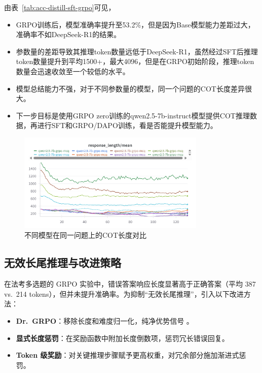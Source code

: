 \documentclass{pkuthesis}
\begin{document}
由表~\ref{tab:acc-distill-sft-grpo}可见，  
\begin{itemize}
  \item GRPO训练后，模型准确率提升至53.2\%，但是因为Base模型能力差距过大，准确率不如DeepSeek-R1的结果。
  \item 参数量的差距导致其推理token数量远低于DeepSeek-R1，虽然经过SFT后推理token数量提升到平均1500+，最大4096，但是在GRPO初始阶段，推理token数量会迅速收敛至一个较低的水平。
  \item 模型总结能力不强，对于不同参数量的模型，同一个问题的COT长度差异很大。
  \item 下一步目标是使用GRPO zero训练的qwen2.5-7b-instruct模型提供COT推理数据，再进行SFT和GRPO/DAPO训练，看是否能提升模型能力。
\end{itemize}
\begin{figure}[h]
  \centering
  \includegraphics[width=0.8\textwidth]{figures/COT_length_comparison.png}
  \caption{不同模型在同一问题上的COT长度对比}
  \label{fig:cot-length-comparison}
\end{figure}


\subsection{无效长尾推理与改进策略}

在法考多选题的 GRPO 实验中，错误答案响应长度显著高于正确答案（平均 387 vs.\ 214 tokens），但并未提升准确率。为抑制“无效长尾推理”，引入以下改进方法：

\begin{itemize}
  \item \textbf{Dr.\ GRPO}：移除长度和难度归一化，纯净优势信号 \cite{liu2025understanding}。
  \item \textbf{显式长度惩罚}：在奖励函数中附加长度倒数项，惩罚冗长错误回复。
  \item \textbf{Token 级奖励}：对关键推理步骤赋予更高权重，对冗余部分施加渐进式惩罚。
\end{itemize}
\end{document}
